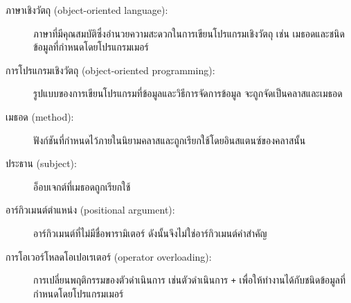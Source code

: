 \begin{description}

  
\item[ภาษาเชิงวัตถุ (object-oriented language):] ภาษาที่มีคุณสมบัติซึ่งอำนวยความสะดวกในการเขียนโปรแกรมเชิงวัตถุ เช่น เมธอดและชนิดข้อมูลที่กำหนดโดยโปรแกรมเมอร์ 


\item[การโปรแกรมเชิงวัตถุ (object-oriented programming):] รูปแบบของการเขียนโปรแกรมที่ข้อมูลและวิธีการจัดการข้อมูล จะถูกจัดเป็นคลาสและเมธอด


\item[เมธอด (method):] ฟังก์ชันที่กำหนดไว้ภายในนิยามคลาสและถูกเรียกใช้โดยอินสแตนซ์ของคลาสนั้น


\item[ประธาน (subject):] อ็อบเจกต์ที่เมธอดถูกเรียกใช้


\item[อาร์กิวเมนต์ตำแหน่ง (positional argument):]  อาร์กิวเมนต์ที่ไม่มีชื่อพารามิเตอร์ ดังนั้นจึงไม่ใช่อาร์กิวเมนต์คำสำคัญ


\item[การโอเวอร์โหลดโอเปอเรเตอร์ (operator overloading):] การเปลี่ยนพฤติกรรมของตัวดำเนินการ เช่นตัวดำเนินการ {\tt +} เพื่อให้ทำงานได้กับชนิดข้อมูลที่กำหนดโดยโปรแกรมเมอร์


\end{description}
